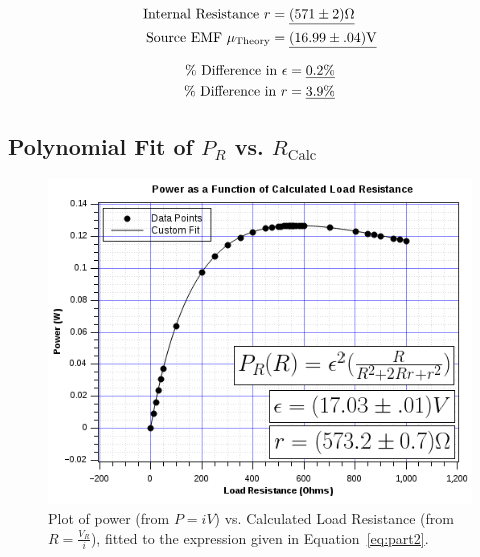 \documentclass[twocolumn,english]{IEEEtran}
\theoremstyle{plain}
\theoremstyle{plain}
\begin{document}
  \begin{align*}
   \text{Internal Resistance $r$} 		&=\text{\underline{$(571 \pm 2)\Omega$}}	\\
   \text{Source EMF }\mu_{\text{Theory}}	&=\text{\underline{$(16.99 \pm .04)$V}}
  \end{align*}

  \begin{align*}
   \text{\% Difference in }\epsilon 	&=\text{\underline{0.2\%}}	\\
   \text{\% Difference in }r		&=\text{\underline{3.9\%}}
  \end{align*}

  \subsection{\textbf{Polynomial Fit of $P_R$ vs. $R_{\text{Calc}}$}}

  \begin{figure}[htpb]
  \begin{centering}
  \begin{center}
  \includegraphics[width=\linewidth]{./power_graph.png}
  \caption{Plot of power (from $P=iV$) vs. Calculated Load Resistance (from $R=\frac{V_R}{i}$), fitted to the expression given in Equation~\ref{eq:part2}.}
  \label{fig:power_graph}
  \end{center}
  \par\end{centering}
  \end{figure}
\end{document}

